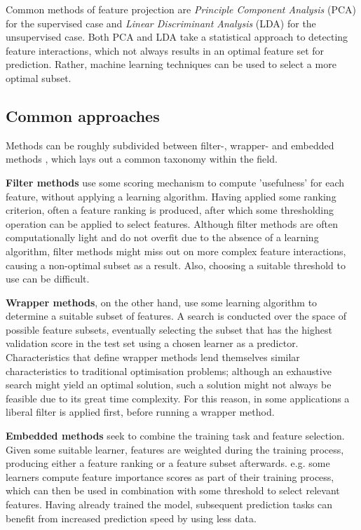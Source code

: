 \documentclass{article}
\begin{document}
Common methods of feature projection are \textit{Principle Component Analysis} (PCA) for the supervised case and \textit{Linear Discriminant Analysis} (LDA) for the unsupervised case. Both PCA and LDA take a statistical approach to detecting feature interactions, which not always results in an optimal feature set for prediction. Rather, machine learning techniques can be used to select a more optimal subset.

\subsection{Common approaches}
Methods can be roughly subdivided between filter-, wrapper- and embedded methods \citep{chandrashekar2014survey}, which lays out a common taxonomy within the field.

\textbf{Filter methods} use some scoring mechanism to compute 'usefulness' for each feature, without applying a learning algorithm. Having applied some ranking criterion, often a feature ranking is produced, after which some thresholding operation can be applied to select features. Although filter methods are often computationally light and do not overfit due to the absence of a learning algorithm, filter methods might miss out on more complex feature interactions, causing a non-optimal subset as a result. Also, choosing a suitable threshold to use can be difficult.

\textbf{Wrapper methods}, on the other hand, use some learning algorithm to determine a suitable subset of features. A search is conducted over the space of possible feature subsets, eventually selecting the subset that has the highest validation score in the test set using a chosen learner as a predictor. Characteristics that define wrapper methods lend themselves similar characteristics to traditional optimisation problems; although an exhaustive search might yield an optimal solution, such a solution might not always be feasible due to its great time complexity. For this reason, in some applications a liberal filter is applied first, before running a wrapper method.

\textbf{Embedded methods} seek to combine the training task and feature selection. Given some suitable learner, features are weighted during the training process, producing either a feature ranking or a feature subset afterwards. e.g. some learners compute feature importance scores as part of their training process, which can then be used in combination with some threshold to select relevant features. Having already trained the model, subsequent prediction tasks can benefit from increased prediction speed by using less data.
\end{document}
